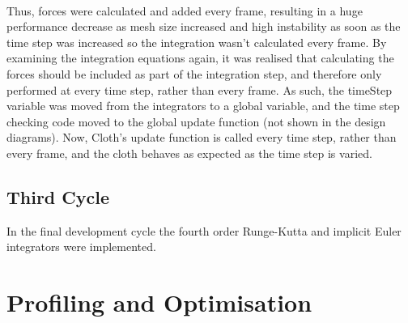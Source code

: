 \\Thus, forces were calculated and added every frame, resulting in a huge performance decrease as mesh size increased and high instability as soon as the time step was increased so the integration wasn't calculated every frame. By examining the integration equations again, it was realised that calculating the forces should be included as part of the integration step, and therefore only performed at every time step, rather than every frame. As such, the timeStep variable was moved from the integrators to a global variable, and the time step checking code moved to the global update function (not shown in the design diagrams). Now, Cloth's update function is called every time step, rather than every frame, and the cloth behaves as expected as the time step is varied.

\subsection{Third Cycle}
In the final development cycle the fourth order Runge-Kutta and implicit Euler integrators were implemented.

\section{Profiling and Optimisation}
\label{sec:optimisation}

